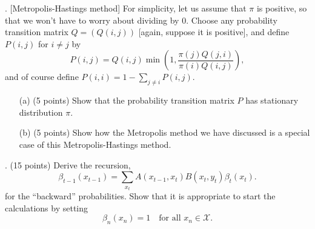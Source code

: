 \documentclass{article}
\begin{document}
\bigskip

. [Metropolis-Hastings method] For simplicity, let us assume that $\pi$ is positive, so that we won’t have to worry about dividing by 0. Choose any probability transition matrix $Q = (Q(i,j))$ [again, suppose it is positive], and define $P(i,j)$ for $i \neq j$ by
\[
P(i,j) = Q(i,j) \min \left( 1, \frac{\pi(j)Q(j,i)}{\pi(i)Q(i,j)} \right),
\]
and of course define $P(i,i) = 1 - \sum_{j \neq i} P(i,j)$. 

\begin{itemize}

    \item[(a)] (5 points) Show that the probability transition matrix $P$ has stationary distribution $\pi$. 

    \textcolor{blue}{}

    \item[(b)] (5 points) Show how the Metropolis method we have discussed is a special case of this Metropolis-Hastings method.

    \textcolor{blue}{}

\end{itemize}


\bigskip

. (15 points) Derive the recursion, 
\[
\beta_{t-1}(x_{t-1}) = \sum_{x_t} A(x_{t-1}, x_t) B(x_t, y_t) \beta_t(x_t).
\]
for the “backward” probabilities. Show that it is appropriate to start the calculations by setting
\[
\beta_n(x_n) = 1 \quad \text{for all } x_n \in \mathcal{X}.
\]


\textcolor{blue}{}

\bigskip
\end{document}
